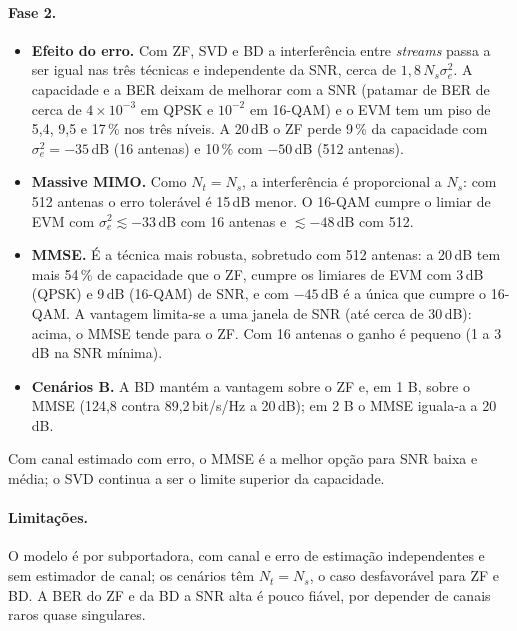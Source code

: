 \paragraph{Fase 2.}
\begin{itemize}
  \item \textbf{Efeito do erro.} Com ZF, SVD e BD a interferência entre \emph{streams} passa a ser igual nas três técnicas e independente da SNR, cerca de $1{,}8\,N_s\sigma_e^2$. A capacidade e a BER deixam de melhorar com a SNR (patamar de BER de cerca de $4\times10^{-3}$ em QPSK e $10^{-2}$ em 16-QAM) e o EVM tem um piso de 5,4, 9,5 e 17\,\% nos três níveis. A 20\,dB o ZF perde 9\,\% da capacidade com $\sigma_e^2=-35$\,dB (16 antenas) e 10\,\% com $-50$\,dB (512 antenas).
  \item \textbf{Massive MIMO.} Como $N_t=N_s$, a interferência é proporcional a $N_s$: com 512 antenas o erro tolerável é 15\,dB menor. O 16-QAM cumpre o limiar de EVM com $\sigma_e^2\lesssim-33$\,dB com 16 antenas e $\lesssim-48$\,dB com 512.
  \item \textbf{MMSE.} É a técnica mais robusta, sobretudo com 512 antenas: a 20\,dB tem mais 54\,\% de capacidade que o ZF, cumpre os limiares de EVM com 3\,dB (QPSK) e 9\,dB (16-QAM) de SNR, e com $-45$\,dB é a única que cumpre o 16-QAM. A vantagem limita-se a uma janela de SNR (até cerca de 30\,dB): acima, o MMSE tende para o ZF. Com 16 antenas o ganho é pequeno (1 a 3\,dB na SNR mínima).
  \item \textbf{Cenários B.} A BD mantém a vantagem sobre o ZF e, em 1 B, sobre o MMSE (124,8 contra 89,2\,bit/s/Hz a 20\,dB); em 2 B o MMSE iguala-a a 20\,dB.
\end{itemize}
Com canal estimado com erro, o MMSE é a melhor opção para SNR baixa e média; o SVD continua a ser o limite superior da capacidade.

\paragraph{Limitações.}
O modelo é por subportadora, com canal e erro de estimação independentes e sem estimador de canal; os cenários têm $N_t=N_s$, o caso desfavorável para ZF e BD. A BER do ZF e da BD a SNR alta é pouco fiável, por depender de canais raros quase singulares.
